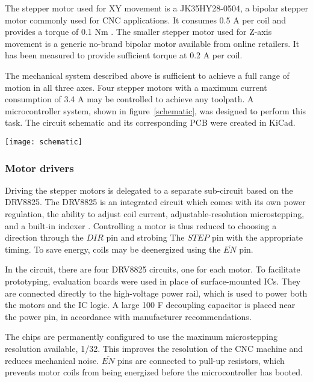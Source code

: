 The stepper motor used for XY movement is a JK35HY28-0504, a bipolar stepper
motor commonly used for CNC applications. It consumes 0.5 A per coil and
provides a torque of 0.1 Nm \cite{jk35hy28}. The smaller stepper motor used for
Z-axis movement is a generic no-brand bipolar motor available from online
retailers. It has been measured to provide sufficient torque at 0.2 A per coil.

The mechanical system described above is sufficient to achieve a full range of
motion in all three axes. Four stepper motors with a maximum current consumption
of 3.4 A may be controlled to achieve any toolpath. A microcontroller system,
shown in figure~\ref{schematic}, was designed to perform this task. The
circuit schematic and its corresponding PCB were created in KiCad.

\clearpage
\begin{sidewaysfigure}[ht]
    \texttt{[image: schematic]}
    \caption{Schematic of the microcontroller system}
    \label{schematic}
\end{sidewaysfigure}

\clearpage

\subsubsection{Motor drivers}

Driving the stepper motors is delegated to a separate sub-circuit based on the
DRV8825. The DRV8825 is an integrated circuit which comes with its own power
regulation, the ability to adjust coil current, adjustable-resolution
microstepping, and a built-in indexer \cite{drv8825}. Controlling a motor is
thus reduced to choosing a direction through the $DIR$ pin and strobing The
$STEP$ pin with the appropriate timing. To save energy, coils may be deenergized
using the $\overline{EN}$ pin.

In the circuit, there are four DRV8825 circuits, one for each motor. To
facilitate prototyping, evaluation boards were used in place of surface-mounted
ICs. They are connected directly to the high-voltage power rail, which is used
to power both the motors and the IC logic. A large 100 {\textmu}F decoupling
capacitor is placed near the power pin, in accordance with manufacturer
recommendations.

The chips are permanently configured to use the maximum microstepping resolution
available, 1/32. This improves the resolution of the CNC machine and
reduces mechanical noise. $\overline{EN}$ pins are connected to pull-up
resistors, which prevents motor coils from being energized before the
microcontroller has booted.

